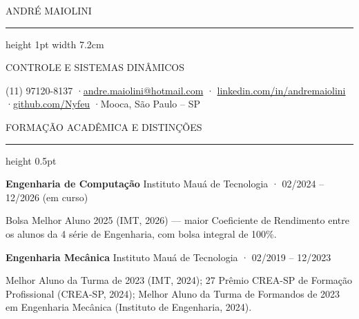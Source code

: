 \documentclass[10pt,a4paper]{article}
\newcommand{\secao}[1]{%
  \Needspace*{6\baselineskip}%
  \vspace{4pt}%
  {\display\fontsize{9.6}{9.6}\selectfont\color{tinta}%
   \addfontfeature{LetterSpace=13}\MakeUppercase{#1}}\par
  \vspace{1.8pt}%
  {\color{filete}\hrule height 0.5pt}%
  \nopagebreak\vspace{6.5pt}%
  \nopagebreak%
}
\begin{document}
\vspace*{0.20cm}
{\display\fontsize{23}{23}\selectfont\color{white}%
 ANDRÉ MAIOLINI}\par
\vspace{6pt}
{\color{claro}\hrule height 1pt width 7.2cm}
\vspace{7pt}
{\display\fontsize{9.4}{9.4}\selectfont\color{filete}%
 CONTROLE E SISTEMAS DINÂMICOS}\par
\vspace{8pt}
{\fontsize{8.4}{8.4}\selectfont\color{filete}%
 (11) 97120-8137 \quad·\quad \href{mailto:andre.maiolini@hotmail.com}{andre.maiolini@hotmail.com} \quad·\quad
 \href{https://linkedin.com/in/andremaiolini}{linkedin.com/in/andremaiolini} \quad·\quad \href{https://github.com/Nyfeu}{github.com/Nyfeu} \quad·\quad Mooca, São Paulo -- SP}\par

\vspace{1.05cm}

\secao{Formação Acadêmica e Distinções}

{\fontsize{9.6}{11.4}\selectfont\bfseries\color{tinta}Engenharia de Computação}%
{\fontsize{8.8}{11.4}\selectfont\color{meio}\quad Instituto Mauá de Tecnologia · 02/2024 – 12/2026 (em curso)}\par
\vspace{1.5pt}
\begin{itens}
  \item Bolsa Melhor Aluno 2025 (IMT, 2026) — maior Coeficiente de Rendimento entre os alunos da 4\textordfeminine{} série de Engenharia, com bolsa integral de 100\%.
\end{itens}
\vspace{4pt}

{\fontsize{9.6}{11.4}\selectfont\bfseries\color{tinta}Engenharia Mecânica}%
{\fontsize{8.8}{11.4}\selectfont\color{meio}\quad Instituto Mauá de Tecnologia · 02/2019 – 12/2023}\par
\vspace{1.5pt}
\begin{itens}
  \item Melhor Aluno da Turma de 2023 (IMT, 2024); 27\textordmasculine{} Prêmio CREA-SP de Formação Profissional (CREA-SP, 2024); Melhor Aluno da Turma de Formandos de 2023 em Engenharia Mecânica (Instituto de Engenharia, 2024).
\end{itens}
\end{document}
